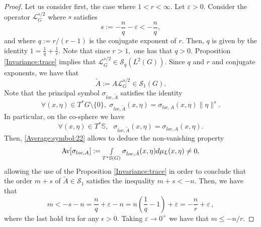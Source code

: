 \documentclass[12pt, reqno]{amsart}
\theoremstyle{definition}
\theoremstyle{remark}
\numberwithin{equation}{section}
\begin{document}
\begin{proof}
 Let us consider first, the case where $1<r<\infty.$ Let $\varepsilon>0.$ Consider the operator $\mathcal{L}_G^{s/2}$ where $s$ satisfies
$$ s:=-\frac{n}{q}-\varepsilon<-\frac{n}{q},$$ and where $q:=r/(r-1)$ is the conjugate exponent of $r.$ Then, $q$ is given by the identity 
$1=\frac{1}{q}+\frac{1}{r}.$ Note that since $r>1,$ one has that $q>0.$ Proposition \ref{Invariance:trace} implies that $\mathcal{L}_G^{s/2}\in \mathscr{S}_q(L^2(G)).$ Since $q$ and $r$ and conjugate exponents, we have that
\begin{equation*}
    \tilde{A}:=A\mathcal{L}_G^{s/2}\in \mathscr{S}_1(G).
\end{equation*}Note that the principal symbol $\sigma_{loc,  \tilde{A}}$ satisfies the identity
\begin{equation}\label{symbol:prin}
   \forall(x,\eta)\in T^{*}G\setminus \{0\},\,\, \sigma_{loc,  \tilde{A}}(x,\eta)=\sigma_{loc,  {A}}(x,\eta)\|\eta \|^{s}.
\end{equation}In particular, on the co-sphere we have
\begin{equation}
   \forall(x,\eta)\in T^{*}\mathbb{S},\,\,\,\, \sigma_{loc,  \tilde{A}}(x,\eta)=\sigma_{loc,  {A}}(x,\eta).
\end{equation}Then, \eqref{Average:symbol:22} allows to deduce the non-vanishing property
\begin{equation*}
    \textnormal{Av}[\sigma_{loc,A}]:=\smallint\limits_{ T^{*}\mathbb{S}(G)}\sigma_{loc,\tilde A}(x,\eta)d\mu_{L}(x,\eta)\neq 0,
\end{equation*}allowing the use of the Proposition \ref{Invariance:trace} in order to conclude that the order $m+s$ of $\tilde A\in \mathscr{S}_1$ satisfies the inequality 
$m+s<-n.$ Then, we have that 
$$  m<-s-n=\frac{n}{q}+\varepsilon -n=n\left(\frac{1}{q}-1\right)+\varepsilon =-\frac{n}{r}+\varepsilon\,, $$
where the last hold tru for any $\epsilon>0$.
Taking $\varepsilon\rightarrow 0^+$ we have that $m\leq -n/r.$



\end{proof}
\end{document}

